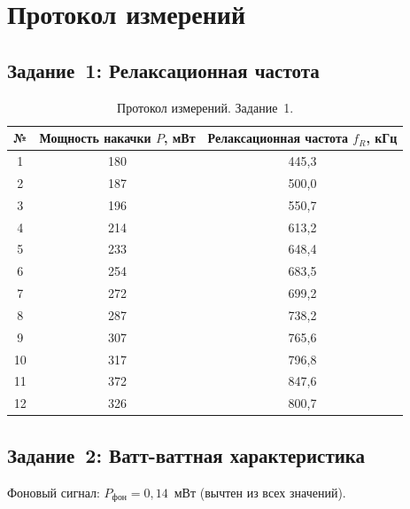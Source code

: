\documentclass[12pt,a4paper]{article}
\begin{document}
\section{Протокол измерений}

\subsection*{Задание~1: Релаксационная частота}

\begin{table}[H]
  \centering
  \begin{tabular}{ccc}
    \toprule
    № & Мощность накачки $P$, мВт & Релаксационная частота $f_R$, кГц \\
    \midrule
    1  & 180 & 445,3 \\
    2  & 187 & 500,0 \\
    3  & 196 & 550,7 \\
    4  & 214 & 613,2 \\
    5  & 233 & 648,4 \\
    6  & 254 & 683,5 \\
    7  & 272 & 699,2 \\
    8  & 287 & 738,2 \\
    9  & 307 & 765,6 \\
    10 & 317 & 796,8 \\
    11 & 372 & 847,6 \\
    12 & 326 & 800,7 \\
    \bottomrule
  \end{tabular}
  \caption{Протокол измерений. Задание~1.}
\end{table}

\subsection*{Задание~2: Ватт-ваттная характеристика}
Фоновый сигнал: $P_\text{фон} = 0{,}14$~мВт (вычтен из всех значений).
\end{document}
